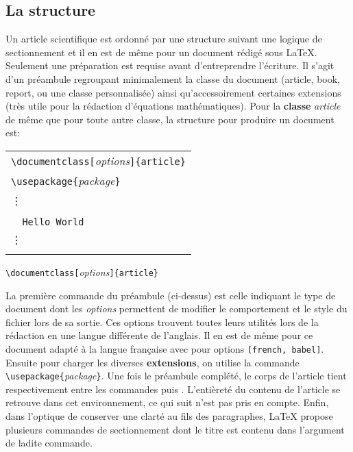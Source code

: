 \subsection*{La structure}
Un article scientifique est ordonné par une structure suivant une logique de sectionnement et il en est de même pour un document rédigé sous \LaTeX. Seulement une préparation est requise avant d'entreprendre l'écriture. Il s'agit d'un préambule regroupant minimalement la classe du document (article, book, report, ou une classe personnalisée) ainsi qu'accessoirement certaines extensions (très utile pour la rédaction d'équations mathématiques). Pour la \textbf{classe} \emph{article} de même que pour toute autre classe, la structure pour produire un document est:
%	
\begin{table}[H]
	\centering
	\begin{tabular}{l}
		\hline
		\verb|\documentclass[|\textit{options}\verb|]|\verb|{article}|\\
		\verb|\usepackage{|\textit{package}\verb|}|\\
		\vdots\\
		\verb||\\
		\verb|	Hello World|\\
		\vdots\\
		\verb||\\
		\hline
	\end{tabular}
\end{table}
%
\begin{center}
	\verb|\documentclass[|\textit{options}\verb|]|\verb|{article}|
\end{center}
%
\par La première commande du préambule (ci-dessus) est celle
indiquant le type de document dont les \textit{options} permettent de modifier le comportement et le style du fichier lors de sa sortie. Ces options trouvent toutes leurs utilités lors de la rédaction en une langue différente de l'anglais. Il en est de même pour ce document adapté à la langue française avec pour options \verb|[french, babel]|. Ensuite pour charger les diverses \textbf{extensions}, on utilise la commande \verb|\usepackage{|\textit{package}\verb|}|. Une fois le préambule complété,  le corps de l'article tient respectivement entre les commandes \verb|| puis \verb||. L'entièreté du contenu de l'article se retrouve dans cet environnement, ce qui suit n'est pas pris en compte. Enfin, dans l'optique de conserver une clarté au fils des paragraphes, \LaTeX{} propose plusieurs commandes de sectionnement dont le titre est contenu dans l'argument de ladite commande.

